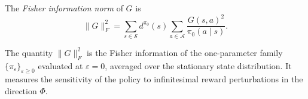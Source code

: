 \begin{definition}\label{def:fisher}
The \emph{Fisher information norm} of $G$ is
\begin{equation}\label{eq:fisher}
\lVert G \rVert_F^2 = \sum_{s \in \mathcal{S}} d^{\pi_0}(s) \sum_{a \in
  \mathcal{A}} \frac{G(s,a)^2}{\pi_0(a \mid s)}.
\end{equation}
\end{definition}

\begin{remark}\label{rem:fisher-interpretation}
The quantity $\lVert G \rVert_F^2$ is the Fisher information of the
one-parameter family $\{\pi_\varepsilon\}_{\varepsilon \geq 0}$ evaluated at
$\varepsilon = 0$, averaged over the stationary state distribution. It
measures the sensitivity of the policy to infinitesimal reward perturbations
in the direction $\Phi$.
\end{remark}
